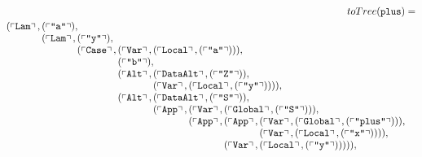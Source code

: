 \begin{figure}
  \begin{small}
  \begin{align*}
    toTree(\hs{plus}) &= \\
      (\feature{\CLam},
       \begin{array}[t]{@{}l@{}}
         (\feature{\id{a}}), \\
         (\feature{\CLam},
          \begin{array}[t]{@{}l@{}}
            (\feature{\id{y}}), \\
            (\feature{\CCase},
             \begin{array}[t]{@{}l@{}}
               (\feature{\CVar}, (\feature{\CLocal}, (\feature{\id{a}}))), \\
               (\feature{\id{b}}), \\
               (\feature{\CAlt},
                \begin{array}[t]{@{}l@{}}
                  (\feature{\CDataAlt}, (\feature{\id{Z}})), \\
                  (\feature{\CVar}, (\feature{\CLocal}, (\feature{\id{y}})))),
                \end{array} \\
               (\feature{\CAlt},
                \begin{array}[t]{@{}l@{}}
                  (\feature{\CDataAlt}, (\feature{\id{S}})), \\
                  (\feature{\CApp},
                   \begin{array}[t]{@{}l@{}}
                     (\feature{\CVar}, (\feature{\CGlobal}, (\feature{\id{S}}))), \\
                     (\feature{\CApp},
                      \begin{array}[t]{@{}l@{}}
                        (\feature{\CApp},
                         \begin{array}[t]{@{}l@{}}
                           (\feature{\CVar}, (\feature{\CGlobal}, (\feature{\id{plus}}))), \\
                           (\feature{\CVar}, (\feature{\CLocal}, (\feature{\id{x}})))),
                         \end{array} \\
                      (\feature{\CVar}, (\feature{\CLocal}, (\feature{\id{y}}))))),
                      \end{array}
                   \end{array} \\

\end{array}
\end{array}
\end{array}
\end{array}
\end{align*}
\end{small}
\end{figure}
